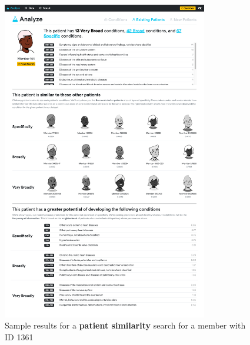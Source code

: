 \documentclass[twoside,11pt]{article}
\begin{document}
{\begin{figure}[H]
	\centering
  \includegraphics[width=0.8\textwidth]{./images/website-screenshot-existing.png}
  \caption{Sample results for a \textbf{patient similarity} search for a member with ID 1361}
\end{figure}

}
\end{document}

